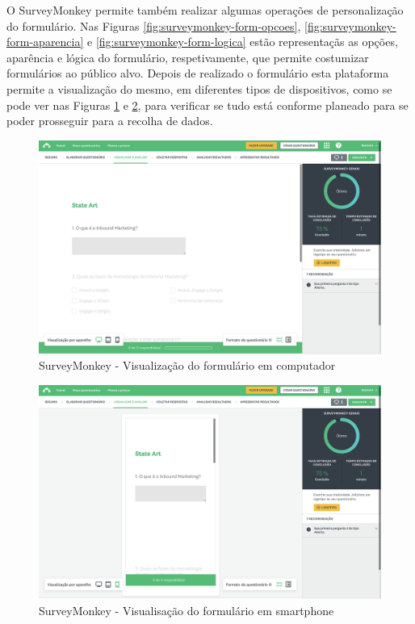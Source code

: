 O SurveyMonkey permite também realizar algumas operações de personalização do formulário. Nas Figuras \ref{fig:surveymonkey-form-opcoes}, \ref{fig:surveymonkey-form-aparencia} e \ref{fig:surveymonkey-form-logica} estão representaçãs as opções, aparência e lógica do formulário, respetivamente, que permite costumizar formulários ao público alvo. 
Depois de realizado o formulário esta plataforma permite a visualização do mesmo, em diferentes tipos de dispositivos, como se pode ver nas Figuras \ref{fig:surveymonkey-form-test-pc} e \ref{fig:surveymonkey-form-test-phone}, para verificar se tudo está conforme planeado para se poder prosseguir para a recolha de dados. 
\newpage

\begin{figure}[ht!]
	\begin{center}
		\includegraphics[width=1\textwidth]{img/sm/surveymonkey-form-test-pc}
		\caption{SurveyMonkey - Visualização do formulário em computador }
		\label{fig:surveymonkey-form-test-pc}
	\end{center}
\end{figure}

\begin{figure}[ht!]
	\begin{center}
		\includegraphics[width=1\textwidth]{img/sm/surveymonkey-form-test-phone}
		\caption{SurveyMonkey - Visualisação do formulário em smartphone }
		\label{fig:surveymonkey-form-test-phone}
	\end{center}
\end{figure}

